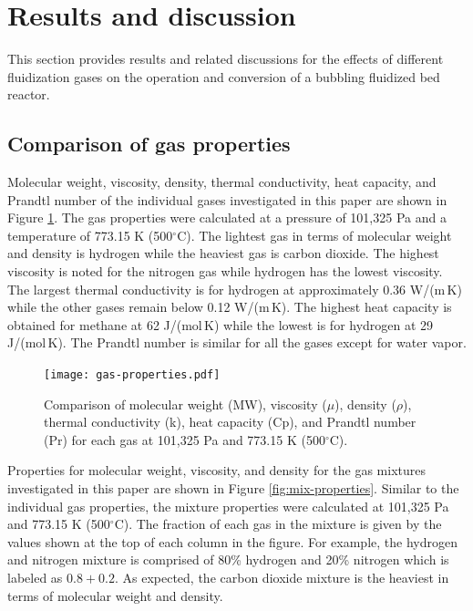 
\section{Results and discussion}

This section provides results and related discussions for the effects of different fluidization gases on the operation and conversion of a bubbling fluidized bed reactor.


\subsection{Comparison of gas properties}

Molecular weight, viscosity, density, thermal conductivity, heat capacity, and Prandtl number of the individual gases investigated in this paper are shown in Figure \ref{fig:gas-properties}. The gas properties were calculated at a pressure of 101,325 Pa and a temperature of 773.15 K (500$^\circ$C). The lightest gas in terms of molecular weight and density is hydrogen while the heaviest gas is carbon dioxide. The highest viscosity is noted for the nitrogen gas while hydrogen has the lowest viscosity. The largest thermal conductivity is for hydrogen at approximately 0.36 W/(m\,K) while the other gases remain below 0.12 W/(m\,K). The highest heat capacity is obtained for methane at 62 J/(mol\,K) while the lowest is for hydrogen at 29 J/(mol\,K). The Prandtl number is similar for all the gases except for water vapor.

\begin{figure}[H]
    \centering
    \texttt{[image: gas-properties.pdf]}
    \caption{Comparison of molecular weight (MW), viscosity ($\mu$), density ($\rho$), thermal conductivity (k), heat capacity (Cp), and Prandtl number (Pr) for each gas at 101,325 Pa and 773.15 K (500$^\circ$C).}
    \label{fig:gas-properties}
\end{figure}

Properties for molecular weight, viscosity, and density for the gas mixtures investigated in this paper are shown in Figure \ref{fig:mix-properties}. Similar to the individual gas properties, the mixture properties were calculated at 101,325 Pa and 773.15 K (500$^\circ$C). The fraction of each gas in the mixture is given by the values shown at the top of each column in the figure. For example, the hydrogen and nitrogen mixture is comprised of 80\% hydrogen and 20\% nitrogen which is labeled as $0.8 + 0.2$. As expected, the carbon dioxide mixture is the heaviest in terms of molecular weight and density.

